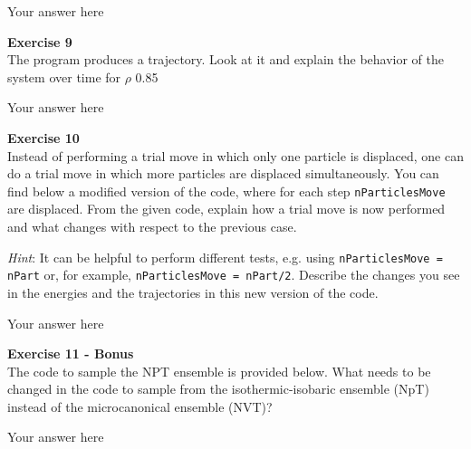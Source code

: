 \documentclass{article}
\begin{document}
Your answer here

\begin{mdframed}
\textbf{Exercise 9}\\
The program produces a trajectory. Look at it and explain the behavior of the system over time for $\rho$ 0.85
\end{mdframed}

Your answer here

\begin{mdframed}
\textbf{Exercise 10}\\
Instead of performing a trial move in which only one particle is displaced, one can do a trial move in which more particles are
displaced simultaneously. You can find below a modified version of the code, where for each step \texttt{nParticlesMove} are displaced.
From the given code, explain how a trial move is now performed and what changes with respect to the previous case.

\textit{Hint}: It can be helpful to perform different tests, e.g. using \texttt{nParticlesMove = nPart} or, for example, \texttt{nParticlesMove = nPart/2}. Describe the changes you see in the energies and the trajectories in this new version of the code.
\end{mdframed}

Your answer here

\begin{mdframed}
\textbf{Exercise 11 - Bonus}\\
The code to sample the NPT ensemble is provided below. What needs to be changed in the code to sample from the isothermic-isobaric ensemble (NpT) instead of the microcanonical ensemble (NVT)?
\end{mdframed}

Your answer here
\end{document}
